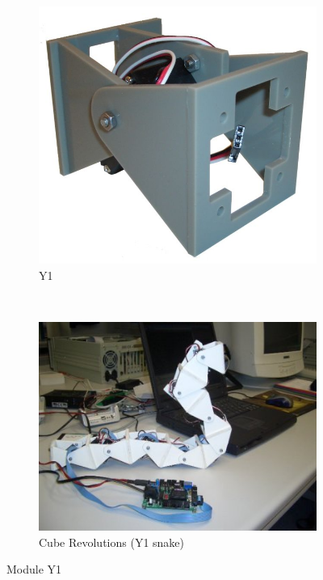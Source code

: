 \begin{figure}[h]
		\centering
        \begin{subfigure}[b]{0.3\textwidth}
                \centering
                \includegraphics[width=\textwidth]{images/Y1_01.jpg}
                \caption{Y1}
                \label{fig:hardware_y1_mod}
        \end{subfigure}
        ~
        \begin{subfigure}[b]{0.3\textwidth}
                \centering
                \includegraphics[width=\textwidth]{images/State_art_Y1_cube.jpeg}
                \caption{Cube Revolutions (Y1 snake)}
                \label{fig:hardware_y1_cube}
        \end{subfigure}
        \caption{Module Y1} \label{fig:hardware_y1}
\end{figure}

